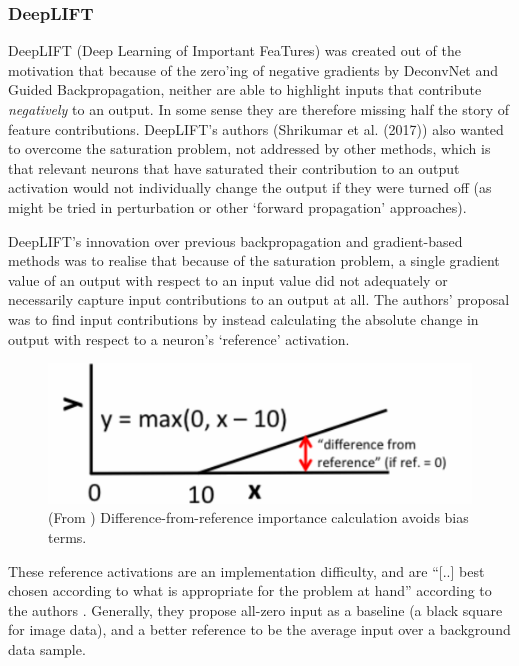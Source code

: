 \documentclass[main]{subfiles}
\begin{document}
\subsubsection{DeepLIFT}

DeepLIFT (Deep Learning of Important FeaTures) \cite{deeplift} was created out of the motivation that because of the zero'ing of negative gradients by DeconvNet and Guided Backpropagation, neither are able to highlight inputs that contribute \textit{negatively} to an output. In some sense they are therefore missing half the story of feature contributions. DeepLIFT's authors (Shrikumar et al. (2017)) also wanted to overcome the saturation problem, not addressed by other methods, which is that relevant neurons that have saturated their contribution to an output activation would not individually change the output if they were turned off (as might be tried in perturbation or other `forward propagation' approaches).

DeepLIFT's innovation over previous backpropagation and gradient-based methods was to realise that because of the saturation problem, a single gradient value of an output with respect to an input value did not adequately or necessarily capture input contributions to an output at all. The authors' proposal was to find input contributions by instead calculating the absolute change in output with respect to a neuron's `reference' activation. 

\begin{figure}[h]
\centering
\includegraphics[scale=0.3]{deeplift.png}
\caption{(From \cite{deeplift}) Difference-from-reference importance calculation avoids bias terms.}
\label{deconvimg}
\end{figure}

These reference activations are an implementation difficulty, and are ``[..] best chosen according to what is appropriate for the problem at hand'' according to the authors \cite{deeplift}. Generally, they propose all-zero input as a baseline (a black square for image data), and a better reference to be the average input over a background data sample.
\end{document}
